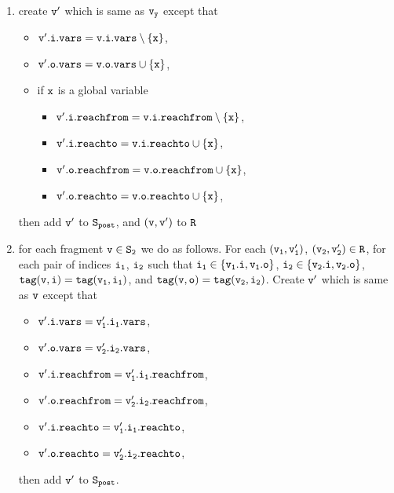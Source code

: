 \begin{itemize}
\begin{enumerate}
\item create $\tt v'$ which is same as $\tt v_y$ except that
\begin{itemize}
\item $\tt v'.i.vars = v.i.vars \setminus \{x\}$,
\item $\tt v'.o.vars = v.o.vars \cup \{x\}$,
\item if $\tt x$ is a global variable
\begin{itemize}
\item $\tt v'.i.reachfrom = v.i.reachfrom \setminus \{x\}$,
\item $\tt v'.i.reachto = v.i.reachto \cup \{x\}$,
 \item $\tt v'.o.reachfrom = v.o.reachfrom \cup \{x\}$,
 \item $\tt v'.o.reachto = v.o.reachto \cup \{x\}$,
\end{itemize}
\end{itemize}
then add $\tt v'$ to $\tt S_{post}$, and $\tt (v,v')$ to $\tt R$
%

\item for each fragment $\tt v \in S_2$ we do as follows. For each $\tt (v_1,v_1')$, $\tt (v_2,v_2') \in R$, for each pair of indices $\tt i_1$, $\tt i_2$ such that $\tt i_1 \in \{v_1.i, v_1.o\}$, $\tt i_2 \in \{v_2.i, v_2.o\}$, $\tt tag(v,i) = tag(v_1, i_1)$, and $\tt tag(v,o) = tag(v_2, i_2)$. Create $\tt v'$ which is same as $\tt v$ except that 
\begin{itemize}
\item $\tt v'.i.vars = v_1'.i_1.vars$,
\item $\tt v'.o.vars = v_2'.i_2.vars$,

\item $\tt v'.i.reachfrom = v_1'.i_1.reachfrom$,
\item $\tt v'.o.reachfrom = v_2'.i_2.reachfrom$,
\item $\tt v'.i.reachto = v_1'.i_1.reachto$,
\item $\tt v'.o.reachto = v_2'.i_2.reachto$,
\end{itemize} then add $\tt v'$ to $\tt S_{post}$. 
\end{enumerate}	






\end{itemize}
